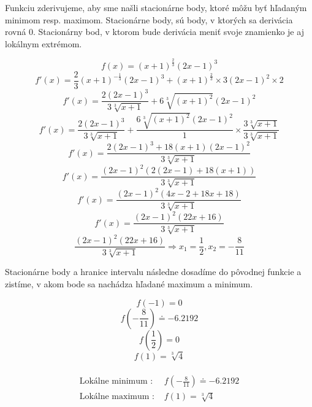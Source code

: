 \documentclass[a4paper]{article}
\begin{document}
	\begin{center}
	Funkciu zderivujeme, aby sme našli stacionárne body, ktoré môžu byť hľadaným minimom resp. maximom. Stacionárne body, sú body, v ktorých sa derivácia rovná 0. Stacionárny bod, v ktorom bude derivácia meniť svoje znamienko je aj lokálnym extrémom.
	\end{center}
	$$f(x)=(x+1)^{\frac{2}{3}}(2x-1)^3$$  
	$$f'(x)=\frac{2}{3}(x+1)^{-\frac{1}{3}}(2x-1)^3 + (x+1)^{\frac{2}{3}} \times 3(2x-1)^2 \times 2$$
	$$f'(x)=\frac{2(2x-1)^3}{3\sqrt[3]{x+1}} +6\sqrt[3]{(x+1)^2}(2x-1)^2 $$
	$$f'(x)=\frac{2(2x-1)^3}{3\sqrt[3]{x+1}} + \frac{6\sqrt[3]{(x+1)^2}(2x-1)^2 }{1} \times \frac{3\sqrt[3]{x+1}}{3\sqrt[3]{x+1}}$$
	$$f'(x)=\frac{2(2x-1)^3 + 18(x+1)(2x-1)^2}{3\sqrt[3]{x+1}}$$
	$$f'(x)=\frac{(2x-1)^2(2(2x-1) +18(x+1))}{3\sqrt[3]{x+1}}$$
	$$f'(x)=\frac{(2x-1)^2(4x-2+18x+18)}{3\sqrt[3]{x+1}}$$
	$$f'(x)=\frac{(2x-1)^2(22x+16)}{3\sqrt[3]{x+1}}$$
	$$\frac{(2x-1)^2(22x+16)}{3\sqrt[3]{x+1}}
	\Rightarrow
	x_{1}=\frac{1}{2}, x_{2}=-\frac{8}{11} $$
	\begin{center}	
	Stacionárne body a hranice intervalu následne dosadíme do pôvodnej funkcie a zistíme, v akom bode sa nachádza hľadané maximum a minimum.
	\end{center}
	
	$$f(-1) = 0$$
	$$f(-\frac{8}{11}) \doteq -6.2192$$ 
	$$f(\frac{1}{2})=0$$
	$$f(1)=\sqrt[3]{4}$$\\
	
	\begin{align*}
	\text{Lokálne minimum : } & f(-\frac{8}{11}) \doteq -6.2192\\
	\text{Lokálne maximum : } & f(1)=\sqrt[3]{4}
	\end{align*}
	
	
\end{document}
